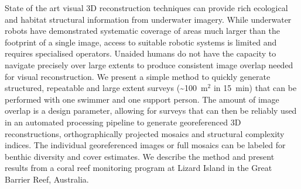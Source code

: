 
State of the art visual 3D reconstruction techniques can provide rich ecological and habitat structural information from underwater imagery. While underwater robots have demonstrated systematic coverage of areas much larger than the footprint of a single image, access to suitable robotic systems is limited and requires specialised operators. Unaided humans do not have the capacity to navigate precisely over large extents to produce consistent image overlap needed for visual reconstruction. We present a simple method to quickly generate structured, repeatable and large extent surveys (\sim{100~m$^{2}$ in 15~min}) that can be performed with one swimmer and one support person. The amount of image overlap is a design parameter, allowing for surveys that can then be reliably used in an automated processing pipeline to generate georeferenced 3D reconstructions, orthographically projected mosaics and structural complexity indices. The individual georeferenced images or full mosaics can be labeled for benthic diversity and cover estimates. We describe the method and present results from a coral reef monitoring program at Lizard Island in the Great Barrier Reef, Australia.
  
  